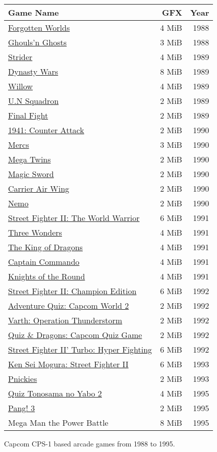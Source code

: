 \begin{figure}[H]
{ \setlength{\tabcolsep}{3.0pt}
\begin{tabularx}{\textwidth}{Xrr} 
  \textbf{Game Name} & \textbf{ GFX }  & \textbf{ Year } \\               
  \toprule    
\href{}{Forgotten Worlds} & 4 MiB & 1988 \\ 
\href{}{Ghouls'n Ghosts} & 3 MiB & 1988 \\ 
  \toprule    
\href{}{Strider} & 4 MiB & 1989 \\ 
\href{}{Dynasty Wars} & 8 MiB & 1989 \\ 
\href{}{Willow} & 4 MiB & 1989 \\ 
\href{}{U.N Squadron} & 2 MiB & 1989 \\ 
\href{}{Final Fight} & 2 MiB & 1989 \\ 
  \toprule    
\href{}{1941: Counter Attack} & 2 MiB &  1990 \\ 
\href{}{Mercs} &  3 MiB & 1990 \\ 
\href{}{Mega Twins} & 2 MiB & 1990 \\ 
\href{}{Magic Sword} & 2 MiB & 1990 \\ 
\href{}{Carrier Air Wing} & 2 MiB  & 1990 \\ 
\href{}{Nemo} & 2 MiB &  1990 \\ 
  \toprule    
\href{}{Street Fighter II: The World Warrior} & 6 MiB & 1991 \\ 
\href{}{Three Wonders} & 4 MiB & 1991 \\ 
\href{}{The King of Dragons} & 4 MiB & 1991 \\ 
\href{}{Captain Commando} &  4 MiB & 1991 \\ 
\href{}{Knights of the Round} & 4 MiB  & 1991 \\ 
  \toprule    
\href{}{Street Fighter II: Champion Edition} & 6 MiB & 1992 \\ 
\href{}{Adventure Quiz: Capcom World 2} & 2 MiB & 1992 \\ 
\href{}{Varth: Operation Thunderstorm} & 2 MiB & 1992 \\ 
\href{}{Quiz \& Dragons: Capcom Quiz Game} & 2 MiB & 1992 \\ 
\href{}{Street Fighter II' Turbo: Hyper Fighting} &  6 MiB & 1992 \\ 
  \toprule    
\href{}{Ken Sei Mogura: Street Fighter II} & 6 MiB & 1993 \\ 
\href{}{Pnickies} & 2 MiB & 1993 \\ 
  \toprule    
\href{}{Quiz Tonosama no Yabo 2} &  4 MiB & 1995 \\ 
\href{}{Pang! 3} & 2 MiB  & 1995 \\ 
Mega Man the Power Battle & 8 MiB  & 1995 \\

\toprule    
\end{tabularx}%
}\caption*{Capcom CPS-1 based arcade games from 1988 to 1995.}
\end{figure}







